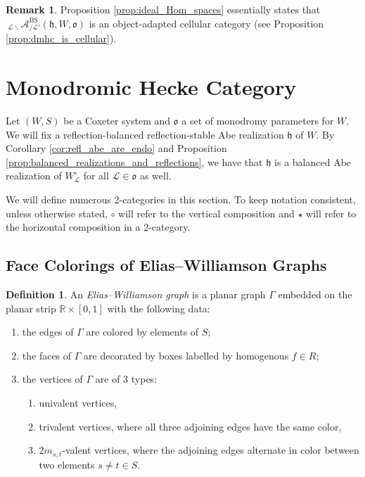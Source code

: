 \documentclass{amsart}
\newcommand{\R}{\mathbb{R}}
\newcommand{\scrL}{\mathcal{L}}
\newcommand{\fr}[1]{\mathfrak{#1}}
\DeclareMathOperator{\BS}{BS}
\newcommand{\Amon}[2]{\:_{#1 \backslash} \mathcal{A}_{/ #2} }
\theoremstyle{definition}
\newtheorem{definition}[subsubsection]{Definition}
\newtheorem{remark}[subsubsection]{Remark}
\numberwithin{equation}{subsection}
\begin{document}
\begin{remark}
    Proposition \ref{prop:ideal_Hom_spaces} essentially states that $\Amon{\scrL}{\scrL'}^{\BS} (\fr{h}, W, \fr{o})$ is an object-adapted cellular category (see Proposition \ref{prop:dmhc_is_cellular}).
\end{remark}

    \section{Monodromic Hecke Category}\label{sec:diag}
Let $(W,S)$ be a Coxeter system and $\fr{o}$ a set of monodromy parameters for $W$.
We will fix a reflection-balanced reflection-stable Abe realization $\fr{h}$ of $W$.
By Corollary \ref{cor:refl_abe_are_endo} and Proposition \ref{prop:balanced_realizations_and_reflections}, we have that $\fr{h}$ is a balanced Abe realization of $W_{\scrL}^{\circ}$ for all $\scrL \in \fr{o}$ as well.

We will define numerous 2-categories in this section. 
To keep notation consistent, unless otherwise stated, $\circ$ will refer to the vertical composition and $\star$ will refer to the horizontal composition in a 2-category. 

\subsection{Face Colorings of Elias--Williamson Graphs}

\begin{definition}
    An \emph{Elias--Williamson graph} is a planar graph $\Gamma$ embedded on the planar strip $\R \times [0,1]$ with the following data:
    \begin{enumerate}
        \item the edges of $\Gamma$ are colored by elements of $S$;
        \item the faces of $\Gamma$ are decorated by boxes labelled by homogenous $f \in R$;
        \item the vertices of $\Gamma$ are of 3 types:
        \begin{enumerate}
            \item univalent vertices,
            \item trivalent vertices, where all three adjoining edges have the same color,
            \item $2m_{s,t}$-valent vertices, where the adjoining edges alternate in color between two elements $s \neq t \in S$.
        \end{enumerate}
    \end{enumerate}
\end{definition}
\end{document}
